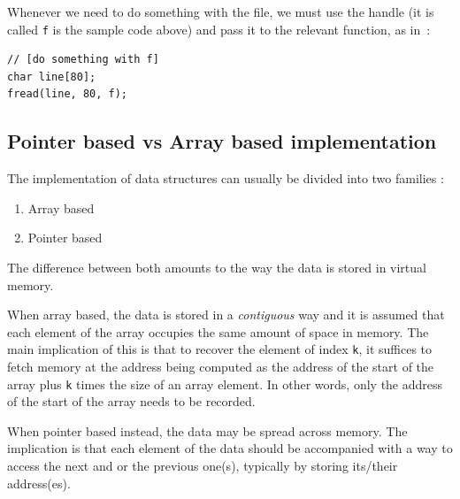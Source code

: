 \documentclass[12pt]{article}
\theoremstyle{plain}
\theoremstyle{remark}
\begin{document}
\medskip

Whenever we need to do something with the file, we must use the handle (it is
called {\tt f} is the sample code above) and pass it to the relevant function,
as in~:
\begin{lstlisting}[style=C]
// [do something with f]
char line[80];
fread(line, 80, f);
\end{lstlisting}

\subsection{Pointer based vs Array based implementation}

The implementation of data structures can usually be divided into two families : 
\begin{enumerate}
	\item Array based
	\item Pointer based
\end{enumerate}
The difference between both amounts to the way the data is stored in virtual
memory. 

\medskip

When array based, the data is stored in a {\it contiguous} way and it is
assumed that each element of the array occupies the same amount of space in
memory. The main implication of this is that to recover the element of index
{\tt k}, it suffices to fetch memory at the address being computed as the address
of the start of the array plus {\tt k} times the size of an array element. In
other words, only the address of the start of the array needs to be recorded. 

When pointer based instead, the data may be spread across memory. The implication is
that each element of the data should be accompanied with a way to access the
next and or the previous one(s), typically by storing its/their address(es).
\end{document}
